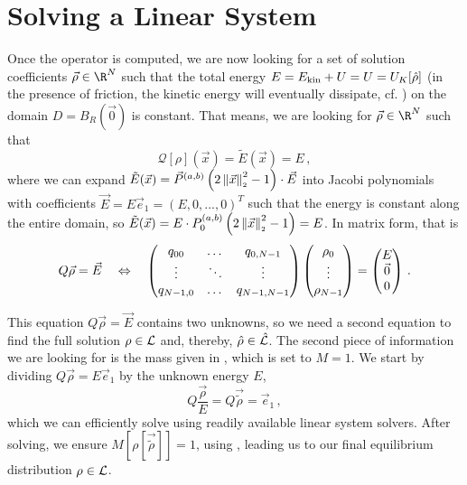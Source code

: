 \section{Solving a Linear System}
Once the operator is computed, we are now looking for a set of solution coefficients $\vec{\rho} \in \R^N$ such that the total energy $E = E_{\rm kin} + U = U = U_K[\hat{\rho}]$ (in the presence of friction, the kinetic energy will eventually dissipate, cf. ) on the domain $D = B_R(\vec{0})$ is constant.
That means, we are looking for $\vec{\rho} \in \R^N$ such that
\begin{equation}
  \mathcal{Q}[\rho](\vec{x}) = \tilde{E}(\vec{x}) = E\,,
\end{equation}
where we can expand $\tilde{E}(\vec{x}) = \vec{P}^{(a, b)}\left(2 \left\lVert\vec{x}\right\rVert_{\scriptscriptstyle 2}^2 - 1\right) \cdot \vec{E}$ into Jacobi polynomials with coefficients $\vec{E} = E \vec{e}_1 = (E, 0, ..., 0)^T$ such that the energy is constant along the entire domain, so $\tilde{E}(\vec{x}) = E \cdot P_0^{(a, b)}\left(2 \left\lVert\vec{x}\right\rVert_{\scriptscriptstyle 2}^2 - 1\right) = E$.
In matrix form, that is
$$Q \vec{\rho} = \vec{E} \quad\Leftrightarrow\quad \begin{pmatrix}
    q_{00}    & \dots  & q_{0,N-1}   \\
    \vdots    & \ddots & \vdots      \\
    q_{N-1,0} & \dots  & q_{N-1,N-1} \\
  \end{pmatrix} \begin{pmatrix}
    \rho_0 \\
    \vdots \\
    \rho_{N-1}
  \end{pmatrix} = \begin{pmatrix}
    E       \\
    \vec{0} \\
    0
  \end{pmatrix}\,.$$

This equation $Q \vec{\rho} = \vec{E}$ contains two unknowns, so we need a second equation to find the full solution $\rho \in \mathcal{L}$ and, thereby, $\hat{\rho} \in \hat{\mathcal{L}}$.
The second piece of information we are looking for is the mass given in , which is set to $M = 1$. We start by dividing $Q \vec{\rho} = E \vec{e}_1$ by the unknown energy $E$,
$$Q \frac{\vec{\rho}}{E} = Q \vec{\tilde{\rho}} = \vec{e}_1\,,$$
which we can efficiently solve using readily available linear system solvers.
After solving, we ensure $M\left[\rho[\vec{\tilde{\rho}}]\right] = 1$, using , leading us to our final equilibrium distribution $\rho \in \mathcal{L}$.

